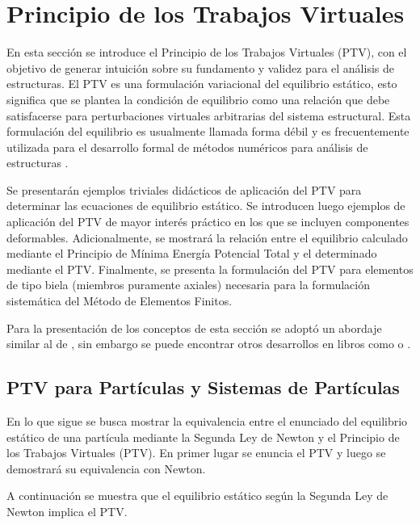\section{Principio de los Trabajos Virtuales}

En esta sección se introduce el Principio de los Trabajos Virtuales (PTV), con el objetivo de generar intuición sobre su fundamento y validez para el análisis de estructuras. %
%
El PTV es una formulación variacional del equilibrio estático, esto significa que se plantea la condición de equilibrio como una relación que debe satisfacerse para perturbaciones virtuales arbitrarias del sistema estructural. %
%
Esta formulación del equilibrio es usualmente llamada forma débil y es frecuentemente utilizada para el desarrollo formal de métodos numéricos para análisis de estructuras \citep{Hughes1987a}.

Se presentarán ejemplos triviales didácticos de aplicación del PTV para determinar las ecuaciones de equilibrio estático. Se introducen luego ejemplos de aplicación del PTV de mayor interés práctico en los que se incluyen componentes deformables. Adicionalmente, se mostrará la relación entre el equilibrio calculado mediante el Principio de Mínima Energía Potencial Total y el determinado mediante el PTV. Finalmente, se presenta la formulación del PTV para elementos de tipo biela (miembros puramente axiales) necesaria para la formulación sistemática del Método de Elementos Finitos.


Para la presentación de los conceptos de esta sección se adoptó un abordaje similar al de \citep{mcguire1999matrix}, sin embargo se puede encontrar otros desarrollos en libros como \citep{Reddy2002b} o \citep{Bathe2014}.




\subsection{PTV para Partículas y Sistemas de Partículas}

En lo que sigue se busca mostrar la equivalencia entre el enunciado del equilibrio estático de una partícula mediante la Segunda Ley de Newton y el Principio de los Trabajos Virtuales (PTV). En primer lugar se enuncia el PTV y luego se demostrará su equivalencia con Newton.

%
A continuación se muestra que el equilibrio estático según la Segunda Ley de Newton implica el PTV. 

